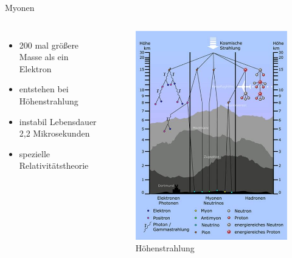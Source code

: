 \documentclass[aspectratio=169,xcolor=dvipsnames]{beamer}
\begin{document}
\begin{frame}{Myonen}
    \begin{columns}[c]
        \begin{itemize}
            \item 200 mal größere Masse als ein Elektron
            \item entstehen bei Höhenstrahlung
            \item instabil Lebensdauer 2,2 Mikrosekunden
            \item spezielle Relativitätstheorie
        \end{itemize}
        \begin{figure}
            \includegraphics[width=0.7\linewidth]{figures/th.jpg}
            \caption{Höhenstrahlung}
            \label{fig:th}
        \end{figure}
    \end{columns}
\end{frame}
\end{document}
